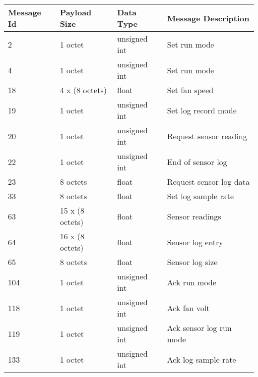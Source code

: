 \begin{center}
    \begin{tabular}{| l | l | l | l |}
    \hline
    Message Id & Payload Size & Data Type & Message Description \\ \hline
    2 & 1 octet & unsigned int & Set run mode \\ \hline
    4 & 1 octet & unsigned int & Set run mode \\ \hline
    18 & 4 x (8 octets) & float & Set fan speed \\ \hline
    19 & 1 octet & unsigned int & Set log record mode \\ \hline
    20 & 1 octet & unsigned int & Request sensor reading \\ \hline
    22 & 1 octet & unsigned int & End of sensor log \\ \hline
    23 & 8 octets & float & Request sensor log data \\ \hline
    33 & 8 octets & float & Set log sample rate \\ \hline
    63 & 15 x (8 octets) & float & Sensor readings \\ \hline
    64 & 16 x (8 octets) & float & Sensor log entry \\ \hline
    65 & 8 octets & float & Sensor log size \\ \hline
    104 & 1 octet & unsigned int & Ack run mode \\ \hline
    118 & 1 octet & unsigned int & Ack fan volt \\ \hline
    119 & 1 octet & unsigned int & Ack sensor log run mode \\ \hline
    133 & 1 octet & unsigned int & Ack log sample rate \\ \hline
    \end{tabular}
\end{center}

